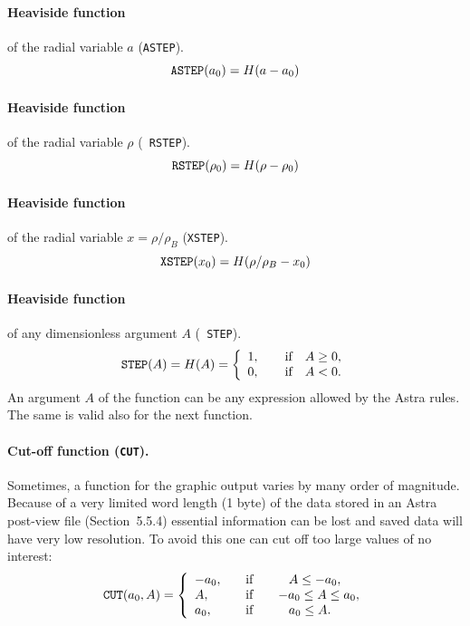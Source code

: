\paragraph{Heaviside function} of the radial variable $a$ ({\tt ASTEP}).
$$
{\tt ASTEP}(a_0)=H(a-a_0)
$$

\paragraph{Heaviside function} of the radial variable $\rho$ ({\tt
RSTEP}). 
$$
{\tt RSTEP}(\rho_0)=H(\rho-\rho_0)
$$

\paragraph{Heaviside function} of the radial variable $x=\rho/\rho_B$
({\tt XSTEP}). 
$$
{\tt XSTEP}(x_0)=H(\rho/\rho_B-x_0)
$$

\paragraph{Heaviside function} of any dimensionless argument $A$ ({\tt
STEP}).
$$
{\tt STEP}(A)=H(A)
=\left\{
\begin{array}{l}
1,\qquad\mbox{if}\quad A\geq 0,\\
0,\qquad\mbox{if}\quad A< 0.
\end{array}\right.
$$
An argument $A$ of the function  can be any expression allowed
by the Astra rules. The same is valid also for the next function.

\paragraph{Cut-off function ({\tt CUT}).}
Sometimes, a function for the graphic output varies by many order of
magnitude. 
Because of a very limited word length (1 byte) of the data stored in 
an Astra post-view file (Section~5.5.4) essential information can be
lost and saved data will have very low resolution. 
To avoid this one can cut off too large values of no interest:
$$
{\tt CUT}(a_0,A)=
\left\{\begin{array}{lll}
-a_0, 	&\quad\mbox{if}\quad & \;\;\;A\leq -a_0,\\
A,	&\quad\mbox{if}\quad & -a_0\leq A\leq a_0,\\
a_0,	&\quad\mbox{if}\quad & \;\;\;a_0\leq A.\\
\end{array}\right.
$$

